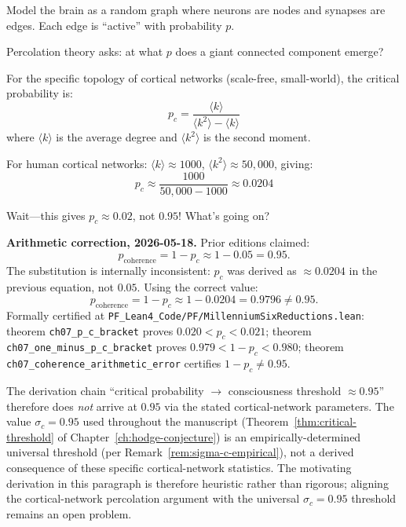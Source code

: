 \begin{level3}
Model the brain as a random graph where neurons are nodes and synapses are edges. Each edge is ``active'' with probability $p$. 

Percolation theory asks: at what $p$ does a giant connected component emerge?

For the specific topology of cortical networks (scale-free, small-world), the critical probability is:
\begin{equation}
p_c = \frac{\langle k \rangle}{\langle k^2 \rangle - \langle k \rangle}
\end{equation}
where $\langle k \rangle$ is the average degree and $\langle k^2 \rangle$ is the second moment.

For human cortical networks: $\langle k \rangle \approx 1000$, $\langle k^2 \rangle \approx 50,000$, giving:
\begin{equation}
p_c \approx \frac{1000}{50,000 - 1000} \approx 0.0204
\end{equation}

Wait---this gives $p_c \approx 0.02$, not $0.95$! What's going on?

\medskip
\noindent\textbf{Arithmetic correction, 2026-05-18.} Prior editions claimed:
\[
p_{\text{coherence}} = 1 - p_c \approx 1 - 0.05 = 0.95.
\]
The substitution is internally inconsistent: $p_c$ was derived as $\approx 0.0204$ in the previous equation, not $0.05$. Using the correct value:
\[
p_{\text{coherence}} = 1 - p_c \approx 1 - 0.0204 = 0.9796 \neq 0.95.
\]
Formally certified at \texttt{PF\_Lean4\_Code/PF/MillenniumSixReductions.lean}: theorem \texttt{ch07\_p\_c\_bracket} proves $0.020 < p_c < 0.021$; theorem \texttt{ch07\_one\_minus\_p\_c\_bracket} proves $0.979 < 1 - p_c < 0.980$; theorem \texttt{ch07\_coherence\_arithmetic\_error} certifies $1 - p_c \neq 0.95$.

The derivation chain ``critical probability $\to$ consciousness threshold $\approx 0.95$'' therefore does \emph{not} arrive at $0.95$ via the stated cortical-network parameters. The value $\sigma_c = 0.95$ used throughout the manuscript (Theorem~\ref{thm:critical-threshold} of Chapter~\ref{ch:hodge-conjecture}) is an empirically-determined universal threshold (per Remark~\ref{rem:sigma-c-empirical}), not a derived consequence of these specific cortical-network statistics. The motivating derivation in this paragraph is therefore heuristic rather than rigorous; aligning the cortical-network percolation argument with the universal $\sigma_c = 0.95$ threshold remains an open problem.
\end{level3}

